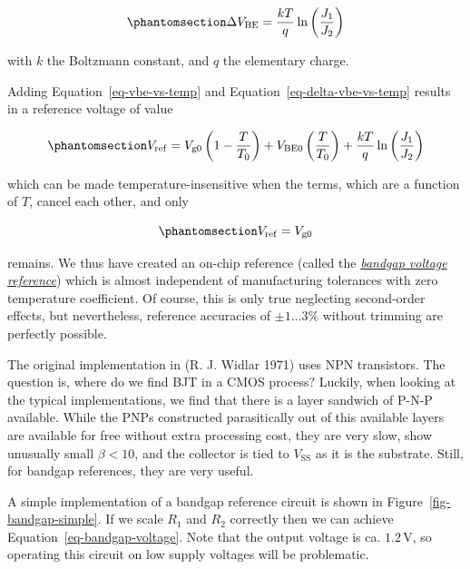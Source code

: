 \documentclass[
  a4paper,
  DIV=11,
  numbers=noendperiod]{scrartcl}
\begin{document}
\begin{equation}\phantomsection\label{eq-delta-vbe-vs-temp}{
\Delta V_\mathrm{BE}= \frac{k T}{q} \ln \left( \frac{J_1}{J_2} \right)
}\end{equation}

with \(k\) the Boltzmann constant, and \(q\) the elementary charge.

Adding Equation~\ref{eq-vbe-vs-temp} and
Equation~\ref{eq-delta-vbe-vs-temp} results in a reference voltage of
value

\begin{equation}\phantomsection\label{eq-bandgap-voltage-with-temp}{
V_\mathrm{ref} =  V_\mathrm{g0} \left( 1 - \frac{T}{T_0} \right) + V_\mathrm{BE0} \left( \frac{T}{T_0} \right) +  \frac{k T}{q} \ln \left( \frac{J_1}{J_2} \right)
}\end{equation}

which can be made temperature-insensitive when the terms, which are a
function of \(T\), cancel each other, and only

\begin{equation}\phantomsection\label{eq-bandgap-voltage}{
V_\mathrm{ref} =  V_\mathrm{g0}
}\end{equation}

remains. We thus have created an on-chip reference (called the
\href{https://en.wikipedia.org/wiki/Bandgap_voltage_reference}{\emph{bandgap
voltage reference}}) which is almost independent of manufacturing
tolerances with zero temperature coefficient. Of course, this is only
true neglecting second-order effects, but nevertheless, reference
accuracies of \(\pm 1 \ldots 3\%\) without trimming are perfectly
possible.

The original implementation in (R. J. Widlar 1971) uses NPN transistors.
The question is, where do we find BJT in a CMOS process? Luckily, when
looking at the typical implementations, we find that there is a layer
sandwich of P-N-P available. While the PNPs constructed parasitically
out of this available layers are available for free without extra
processing cost, they are very slow, show unusually small
\(\beta < 10\), and the collector is tied to \(V_\mathrm{SS}\) as it is
the substrate. Still, for bandgap references, they are very useful.

A simple implementation of a bandgap reference circuit is shown in
Figure~\ref{fig-bandgap-simple}. If we scale \(R_1\) and \(R_2\)
correctly then we can achieve Equation~\ref{eq-bandgap-voltage}. Note
that the output voltage is ca. \(1.2\,\text{V}\), so operating this
circuit on low supply voltages will be problematic.
\end{document}
